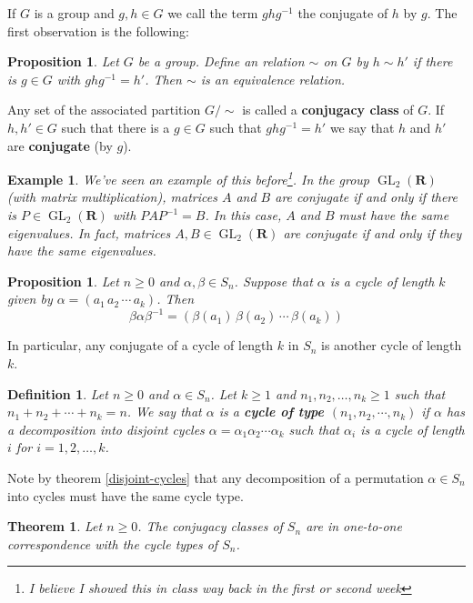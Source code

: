 \documentclass[12pt]{article}
\numberwithin{equation}{subsection}
\newtheorem{thm}[subsection]{Theorem}
\newtheorem{prop}[subsection]{Proposition}
\newtheorem{defn}[subsection]{Definition}
\theoremstyle{note}
\newtheorem{example}[subsection]{Example}
\newcommand{\GL}{\operatorname{GL}}
\begin{document}
If $G$ is a group and $g,h\in G$ we call the term $ghg^{-1}$ the conjugate of $h$ by $g$. The first observation is the following:

\begin{prop}
	Let $G$ be a group. Define an relation $\sim$ on $G$ by $h\sim h'$ if there is $g\in G$ with $ghg^{-1}=h'$. Then $\sim$ is an equivalence relation.
\end{prop}

Any set of the associated partition $G/\sim$ is called a \textbf{conjugacy class} of $G$. If $h,h'\in G$ such that there is a $g\in G$ such that $ghg^{-1}=h'$ we say that $h$ and $h'$ are \textbf{conjugate} (by $g$). 

\begin{example}
	We've seen an example of this before\footnote{I believe I showed this in class way back in the first or second week}. In the group $\GL_2(\mathbf{R})$ (with matrix multiplication), matrices $A$ and $B$ are conjugate if and only if there is $P\in \GL_2(\mathbf{R})$ with $PAP^{-1}=B$. In this case, $A$ and $B$ must have the same eigenvalues. In fact, matrices $A,B\in \GL_2(\mathbf{R})$ are conjugate if and only if they have the same eigenvalues. 

\end{example}


\begin{prop} Let $n\geq 0$ and $\alpha,\beta\in S_n$. Suppose that $\alpha$ is a cycle of length $k$ given by $\alpha=(a_1 \, a_2\, \cdots \, a_k)$. Then \[\beta\alpha\beta^{-1}=(\beta(a_1) \, \beta(a_2)\, \cdots \, \beta(a_k))\]

\end{prop}
In particular, any conjugate of a cycle of length $k$ in $S_n$ is another cycle of length $k$. 


\begin{defn}
Let $n\geq 0$ and $\alpha\in S_n$. Let $k\geq 1$ and $n_1,n_2,\dots,n_k\geq 1$ such that $n_1+n_2+\cdots+n_k=n$. We say that $\alpha$ is a \textbf{cycle of type $(n_1,n_2,\cdots,n_k)$} if $\alpha$ has a decomposition into disjoint cycles $\alpha=\alpha_1\alpha_2\cdots\alpha_k$ such that $\alpha_i$ is a cycle of length $i$ for $i=1,2,\dots,k$. 
\end{defn}

Note by theorem \ref{disjoint-cycles} that any decomposition of a permutation $\alpha\in S_n$ into cycles must have the same cycle type. 


\begin{thm}
	Let $n\geq 0$. The conjugacy classes of $S_n$ are in one-to-one correspondence with the cycle types of $S_n$. 
\end{thm}
\end{document}
